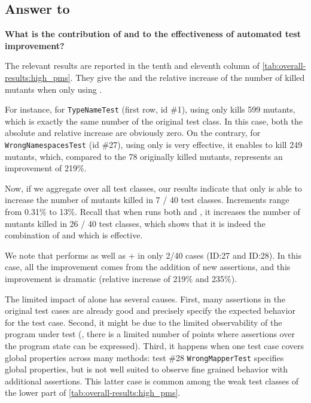 \subsection{Answer to \rqAmplVersusIAmpl}

\textbf{What is the contribution of \Iampl{} and \Aampl{} to the effectiveness of automated test improvement?}

The relevant results are reported in the tenth and eleventh column of \autoref{tab:overall-results:high_pms}. %
They give the \ams and the relative increase of the number of killed mutants when only using \Aampl.

For instance, for \texttt{TypeNameTest} (first row, id \#1), using only \Aampl kills 599 mutants, which is exactly the same number of the original test class. In this case, both the absolute and relative increase are obviously zero.
On the contrary, for \texttt{WrongNamespacesTest} (id \#27), using only \Aampl  is very effective, it enables \dspot to kill 249 mutants, which, compared to the 78 originally killed mutants, represents an improvement of 219\%. 

Now, if we aggregate over all test classes, our results indicate that \Aampl only is able to increase the number of mutants killed in 7 / 40 test classes. Increments range from 0.31\% to 13\%. 
Recall that when \dspot runs both \Iampl{} and \Aampl, it increases the number of mutants killed in 26 / 40 test classes, which shows that it is indeed the combination of \Aampl and \Iampl which is effective.

We note that \Aampl{} performs as well as \Iampl + \Aampl in only 2/40 cases (ID:27 and ID:28). In this case, all the improvement comes from the addition of new assertions, and this improvement is dramatic (relative increase of 219\% and 235\%).

The limited impact of \Aampl alone has several causes. First, many assertions in the original test cases are already good and precisely specify the expected behavior for the test case.
Second, it might be due to the limited observability of the program under test (\ie, there is a limited number of points where assertions over the program state can be expressed).
Third, it happens when one test case covers global properties across many methods: test \#28 \texttt{WrongMapperTest} specifies global properties, but is not well suited to observe fine grained behavior with additional assertions. This latter case is common among the weak test classes of the lower part of \autoref{tab:overall-results:high_pms}.



